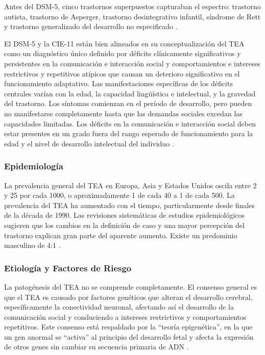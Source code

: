 Antes del DSM-5, cinco trastornos superpuestos capturaban el espectro:
trastorno autista, trastorno de Asperger, trastorno desintegrativo infantil,
síndrome de Rett y trastorno generalizado del desarrollo no especificado
\cite{Boland2021-by}.

El DSM-5 y la CIE-11 están bien alineados en su conceptualización del TEA como
un diagnóstico único definido por déficits clínicamente significativos y
persistentes en la comunicación e interacción social y comportamientos e
intereses restrictivos y repetitivos atípicos que causan un deterioro
significativo en el funcionamiento adaptativo. Las manifestaciones específicas
de los déficits centrales varían con la edad, la capacidad lingüística e
intelectual, y la gravedad del trastorno. Los síntomas comienzan en el período
de desarrollo, pero pueden no manifestarse completamente hasta que las demandas
sociales excedan las capacidades limitadas. Los déficits en la comunicación e
interacción social deben estar presentes en un grado fuera del rango esperado
de funcionamiento para la edad y el nivel de desarrollo intelectual del
individuo \cite{DSM5TR, Myers2025}.

\subsubsection{Epidemiología}
La prevalencia general del TEA en Europa, Asia y Estados Unidos oscila entre 2
y 25 por cada 1000, o aproximadamente 1 de cada 40 a 1 de cada 500. La
prevalencia del TEA ha aumentado con el tiempo, particularmente desde finales
de la década de 1990. Las revisiones sistemáticas de estudios epidemiológicos
sugieren que los cambios en la definición de caso y una mayor percepción del
trastorno explican gran parte del aparente aumento. Existe un predominio
masculino de 4:1 \cite{AutismUpToDate, Nelson58}.

\subsubsection{Etiología y Factores de Riesgo}
La patogénesis del TEA no se comprende completamente. El consenso general es
que el TEA es causado por factores genéticos que alteran el desarrollo
cerebral, específicamente la conectividad neuronal, afectando así el
desarrollo de la comunicación social y conduciendo a intereses restrictivos y
comportamientos repetitivos. Este consenso está respaldado por la ``teoría
epigenética'', en la que un gen anormal se ``activa'' al principio del
desarrollo fetal y afecta la expresión de otros genes sin cambiar su secuencia
primaria de ADN \cite{AutismUpToDate}.

